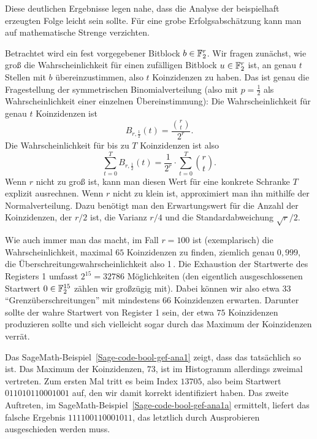 \begin{refsegment}
Diese deutlichen Ergebnisse legen nahe, dass die Analyse der beispielhaft
erzeugten Folge leicht sein sollte. Für eine grobe Erfolgsabschätzung
kann man auf mathematische Strenge verzichten.

Betrachtet wird ein fest vorgegebener Bitblock $b \in \mathbb{F}_2^r$. Wir fragen
zunächst, wie groß die Wahrscheinlichkeit für einen zufälligen Bitblock
$u \in \mathbb{F}_2^r$ ist, an genau $t$ Stellen mit $b$ übereinzustimmen,
also $t$ Koinzidenzen zu haben. Das ist genau die Fragestellung der
symmetrischen Binomialverteilung
(also mit $p = \frac{1}{2}$ als
Wahrscheinlichkeit einer einzelnen Übereinstimmung): Die
Wahrscheinlichkeit für genau $t$ Koinzidenzen ist
\[
     B_{r,\frac{1}{2}}(t)  =  \frac{\binom{r}{t}}{2^r}.
\]
Die Wahrscheinlichkeit für bis zu $T$ Koinzidenzen ist also
\[
     \sum_{t=0}^T B_{r,\frac{1}{2}}(t)
       =  \frac{1}{2^r} \cdot \sum_{t=0}^T \binom{r}{t}.
\]
Wenn $r$ nicht zu groß ist, kann man diesen Wert für eine konkrete
Schranke $T$ explizit ausrechnen. Wenn $r$ nicht zu klein ist,
approximiert man ihn mithilfe der Normalverteilung.
Dazu benötigt man den Erwartungswert für die
Anzahl der Koinzidenzen, der $r/2$ ist, die Varianz $r/4$ und die
Standardabweichung $\sqrt{r}/2$.

Wie auch immer man das macht, im Fall $r = 100$ ist (exemplarisch) die
Wahrscheinlichkeit, maximal $65$ Koinzidenzen zu finden, ziemlich
genau $0,999$, die Überschreitungswahrscheinlichkeit also
1\,\permil. Die Exhaustion der Startwerte des Registers 1
umfasst $2^{15} = 32786$ Möglichkeiten (den eigentlich ausgeschlossenen
Startwert $0 \in \mathbb{F}_2^{15}$ zählen wir großzügig mit). Dabei
können wir also etwa $33$ "`Grenzüberschreitungen"' mit mindestens
66 Koinzidenzen erwarten. Darunter sollte der wahre Startwert
von Register 1 sein,
der etwa $75$ Koinzidenzen produzieren sollte und sich vielleicht
sogar durch das Maximum der Koinzidenzen verrät.

Das SageMath-Beispiel~\ref{Sage-code-bool-gef-ana1} zeigt, dass das
tatsächlich so ist. Das Maximum der Koinzidenzen, $73$, ist im
Histogramm allerdings zweimal vertreten. Zum ersten Mal tritt
es beim Index $13705$, also beim Startwert $011010110001001$
auf, den wir damit korrekt identifiziert haben. Das zweite
Auftreten, im SageMath-Beispiel~\ref{Sage-code-bool-gef-ana1a}
ermittelt, liefert das falsche Ergebnis $111100110001011$, das
letztlich durch Ausprobieren ausgeschieden werden muss.


\end{refsegment}
